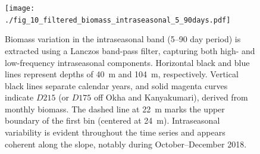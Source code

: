 \documentclass[authoryear,review,11pt]{elsarticle}
\begin{document}
\begin{figure}[htbp]
	\centering
	\texttt{[image: ./fig\_10\_filtered\_biomass\_intraseasonal\_5\_90days.pdf]} 
	\caption{Biomass variation in the intraseasonal band (5--90 day period) is extracted using a Lanczos band-pass filter, capturing both high- and low-frequency intraseasonal components. Horizontal black and blue lines represent depths of 40~m and 104~m, respectively. Vertical black lines separate calendar years, and solid magenta curves indicate $D215$ (or $D175$ off Okha and Kanyakumari), derived from monthly biomass. The dashed line at 22~m marks the upper boundary of the first bin (centered at 24~m). Intraseasonal variability is evident throughout the time series and appears coherent along the slope, notably during October--December 2018.}
	\label{fig:filtered_biomass_intraseasonal_5_90days}
\end{figure}
\end{document}
